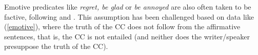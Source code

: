 \documentclass[11pt,fleqn]{article}
\def\infelic{{\leavevmode\llap{\#}}}
\newcommand{\6}{\mbox{$[\hspace*{-.6mm}[$}}
\newcommand{\9}{\mbox{$]\hspace*{-.6mm}]$}}
\begin{document}
%
%
%
%
%
%

%
%
%
%
%





%

Emotive predicates like {\em regret, be glad} or {\em be annoyed} are also often taken to be factive, following \citealt{kiparsky-kiparsky70} and \citealt{karttunen71b}. This assumption has been challenged based on data like (\ref{emotive}), where the truth of the CC does not follow from the affirmative sentences, that is, the CC is not entailed (and neither does the writer/speaker presuppose the truth of the CC).
\end{document}
